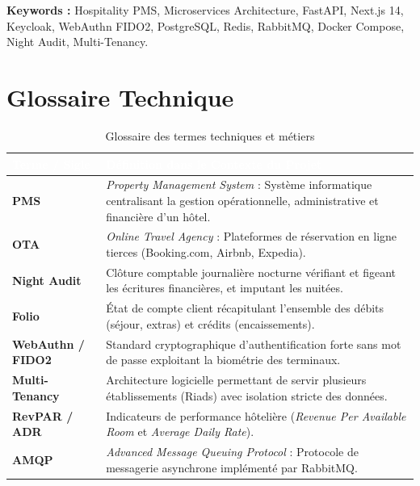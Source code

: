 \vspace{0.8cm}
\noindent\textbf{Keywords :} Hospitality PMS, Microservices Architecture, FastAPI, Next.js 14, Keycloak, WebAuthn FIDO2, PostgreSQL, Redis, RabbitMQ, Docker Compose, Night Audit, Multi-Tenancy.

\clearpage

\chapter*{Glossaire Technique}

\begin{table}[htbp]
\centering
\small
\renewcommand{\arraystretch}{1.3}
\begin{tabularx}{\textwidth}{p{3.2cm} X}
\toprule
\rowcolor{primaryBlue}
\textbf{\textcolor{white}{Terme / Sigle}} & \textbf{\textcolor{white}{Définition dans le Contexte du Projet}} \\
\midrule
\rowcolor{lightGray}
\textbf{PMS} & \textit{Property Management System} : Système informatique centralisant la gestion opérationnelle, administrative et financière d'un hôtel. \\
\textbf{OTA} & \textit{Online Travel Agency} : Plateformes de réservation en ligne tierces (Booking.com, Airbnb, Expedia). \\
\rowcolor{lightGray}
\textbf{Night Audit} & Clôture comptable journalière nocturne vérifiant et figeant les écritures financières, et imputant les nuitées. \\
\textbf{Folio} & État de compte client récapitulant l'ensemble des débits (séjour, extras) et crédits (encaissements). \\
\rowcolor{lightGray}
\textbf{WebAuthn / FIDO2} & Standard cryptographique d'authentification forte sans mot de passe exploitant la biométrie des terminaux. \\
\textbf{Multi-Tenancy} & Architecture logicielle permettant de servir plusieurs établissements (Riads) avec isolation stricte des données. \\
\rowcolor{lightGray}
\textbf{RevPAR / ADR} & Indicateurs de performance hôtelière (\textit{Revenue Per Available Room} et \textit{Average Daily Rate}). \\
\textbf{AMQP} & \textit{Advanced Message Queuing Protocol} : Protocole de messagerie asynchrone implémenté par RabbitMQ. \\
\bottomrule
\end{tabularx}
\caption{Glossaire des termes techniques et métiers}
\label{tab:glossaire}
\end{table}

